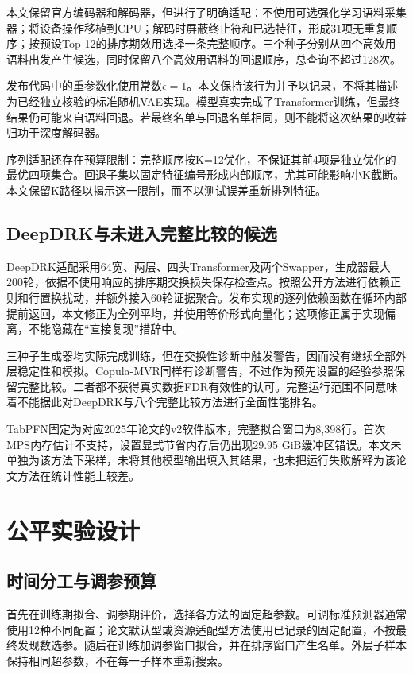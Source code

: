 \documentclass{sufethesismas}
\begin{document}
本文保留官方编码器和解码器，但进行了明确适配：不使用可选强化学习语料采集器；将设备操作移植到CPU；解码时屏蔽终止符和已选特征，形成31项无重复顺序；按预设Top-12的排序期效用选择一条完整顺序。三个种子分别从四个高效用语料出发产生候选，同时保留八个高效用语料的回退顺序，总查询不超过128次。

发布代码中的重参数化使用常数\(\epsilon=1\)。本文保持该行为并予以记录，不将其描述为已经独立核验的标准随机VAE实现。模型真实完成了Transformer训练，但最终结果仍可能来自语料回退。若最终名单与回退名单相同，则不能将这次结果的收益归功于深度解码器。

序列适配还存在预算限制：完整顺序按K=12优化，不保证其前4项是独立优化的最优四项集合。回退子集以固定特征编号形成内部顺序，尤其可能影响小K截断。本文保留K路径以揭示这一限制，而不以测试误差重新排列特征。

\section{DeepDRK与未进入完整比较的候选}

DeepDRK适配采用64宽、两层、四头Transformer及两个Swapper，生成器最大200轮，依据不使用响应的排序期交换损失保存检查点。按照公开方法进行依赖正则和行置换扰动，并额外接入60轮证据聚合。发布实现的逐列依赖函数在循环内部提前返回，本文修正为全列平均，并使用等价形式向量化；这项修正属于实现偏离，不能隐藏在``直接复现''措辞中。

三种子生成器均实际完成训练，但在交换性诊断中触发警告，因而没有继续全部外层稳定性和模拟。Copula-MVR同样有诊断警告，不过作为预先设置的经验参照保留完整比较。二者都不获得真实数据FDR有效性的认可。完整运行范围不同意味着不能据此对DeepDRK与八个完整比较方法进行全面性能排名。

TabPFN固定为对应2025年论文的v2软件版本，完整拟合窗口为8,398行。首次MPS内存估计不支持，设置显式节省内存后仍出现29.95 GiB缓冲区错误。本文未单独为该方法下采样，未将其他模型输出填入其结果，也未把运行失败解释为该论文方法在统计性能上较差。

\chapter{公平实验设计}

\section{时间分工与调参预算}

首先在训练期拟合、调参期评价，选择各方法的固定超参数。可调标准预测器通常使用12种不同配置；论文默认型或资源适配型方法使用已记录的固定配置，不按最终发现数选参。随后在训练加调参窗口拟合，并在排序窗口产生名单。外层子样本保持相同超参数，不在每一子样本重新搜索。
\end{document}

